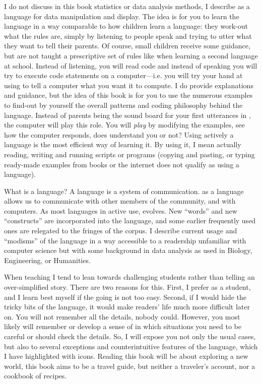 I do not discuss in this book statistics or data analysis methods, I describe \Rlang as a language for data manipulation and display. The idea is for you to learn the \Rlang language in a way comparable to how children learn a language: they work-out what the rules are, simply by listening to people speak and trying to utter what they want to tell their parents. Of course, small children receive some guidance, but are not taught a prescriptive set of rules like when learning a second language at school. Instead of listening, you will read code and instead of speaking you will try to execute \Rlang  code statements on a computer---i.e. you will try your hand at using \Rlang to tell a computer what you want it to compute. I do provide explanations and guidance, but the idea of this book is for you to use the numerous examples to find-out by yourself the overall patterns and coding philosophy behind the \Rlang language. Instead of parents being the sound board for your first utterances in \Rlang, the computer will play this role. You will \emph{play} by modifying the examples, see how the computer responds, does \Rlang understand you or not? Using actively a language is the most efficient way of learning it. By using it, I mean actually reading, writing and running scripts or programs (copying and pasting, or typing ready-made examples from books or the internet does not qualify as using a language).

What is a language? A language is a system of communication. \Rlang as a language allows us to communicate with other members of the \Rlang community, and with computers. As most languages in active use, \Rlang evolves. New ``words'' and new ``constructs'' are incorporated into the language, and some earlier frequently used ones are relegated to the fringes of the corpus. I describe current usage and ``modisms'' of the \Rlang language in a way accessible to a readership unfamiliar with computer science but with some background in data analysis as used in Biology, Engineering, or Humanities.

When teaching I tend to lean towards challenging students rather than telling an over-simplified story. There are two reasons for this. First, I prefer as a student, and I learn best myself if the going is not too easy. Second, if I would hide the tricky bits of the \Rlang language, it would make readers' life much more difficult later on. You will not remember all the details, nobody could. However, you most likely will remember or develop a sense of in which situations you need to be careful or should check the details. So, I will expose you not only the usual cases, but also to several exceptions and counterintuitive features of the language, which I have highlighted with icons. Reading this book will be about exploring a new world, this book aims to be a travel guide, but neither a traveler's account, nor a cookbook of \Rlang recipes.

